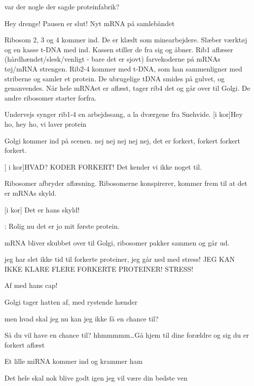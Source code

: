 \documentclass[a4paper,11pt]{article}
\begin{document}
\begin{sketch}
 var der nogle der sagde proteinfabrik?


 Hey drenge! Pausen er slut! Nyt mRNA på samlebåndet


\scene Ribosom 2, 3 og 4 kommer ind. De er klædt som minearbejdere. Slæber værktøj og en kasse t-DNA med ind. Kassen stiller de fra sig og åbner. 
Rib1 aflæser (hårdhændet/slesk/venligt - bare det er sjovt) farvekoderne på mRNAs tøj/mRNA strengen. 
Rib2-4 kommer med t-DNA, som han sammenligner med striberne og samler et protein. De ubrugelige tDNA smides på gulvet, og genanvendes. 
Når hele mRNAet er aflæst, tager rib4 det og går over til Golgi. De andre ribosomer starter forfra.  


Undervejs synger rib1-4 en arbejdssang, a la dværgene fra Snehvide. 
[i kor]Hey ho, hey ho, vi laver protein


\scene Golgi kommer ind på scenen. 
 nej nej nej nej nej, det er forkert, forkert forkert forkert. 


[ i kor]HVAD? KODER FORKERT! Det kender vi ikke noget til.

\scene Ribosomer afbryder aflæsning. Ribosomerne konspirerer, kommer frem til at det er mRNAs skyld. 

[i kor] Det er hans skyld! 


: Rolig nu det er jo mit første protein.


\scene mRNA bliver skubbet over til Golgi, ribosomer pakker sammen og går ud. 


 jeg har slet ikke tid til forkerte proteiner, jeg går ned med stress! JEG KAN IKKE KLARE FLERE FORKERTE PROTEINER! STRESS!




 Af med hans cap!


\scene Golgi tager hatten af, med rystende hænder


 men hvad skal jeg nu kan jeg ikke få en chance til?


 Så du vil have en chance til? hhmmmmm\ldots Gå hjem til dine forældre og sig du er forkert aflæst




\scene Et lille miRNA kommer ind og krammer ham


 Det hele skal nok blive godt igen jeg vil være din bedste ven



\end{sketch}
\end{document}
